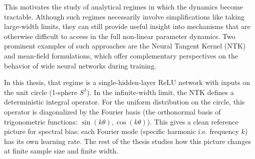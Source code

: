 This motivates the study of analytical regimes in which the dynamics become
tractable. Although such regimes necessarily involve simplifications like
taking large-width limits, they can still provide useful insight into mechanisms that
are otherwise difficult to access in the full non-linear parameter dynamics.
Two prominent examples of such approaches are the Neural Tangent Kernel (NTK) and mean-field
formulations, which offer complementary perspectives on the behavior of wide
neural networks during training.

In this thesis, that regime is a single-hidden-layer ReLU network with inputs
on the unit circle (1-sphere \(S^1\)). In the infinite-width limit, the NTK
defines a deterministic integral operator. For the uniform distribution on the
circle, this operator is diagonalized by the Fourier basis (the orthonormal
basis of trigonometric functions: $\sin(k\theta), \cos(k\theta)$). This gives a
clean reference picture for spectral bias: each Fourier mode (specific
harmonic i.e. frequency $k$) has its own learning rate. The rest of the thesis
studies how this picture changes at finite sample size and finite width.
